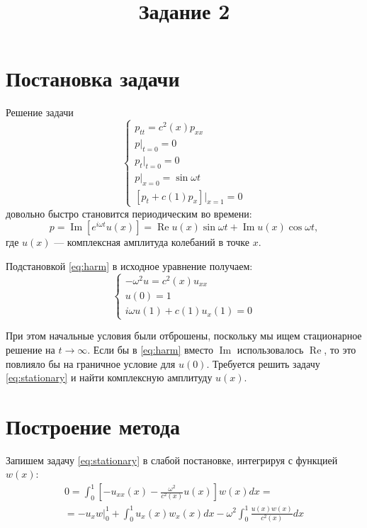 \documentclass[12pt]{article}
\title{Задание 2}
\date{}
\begin{document}
\maketitle

\section{Постановка задачи}

Решение задачи
\[
\begin{cases}
p_{tt} = c^2(x) p_{xx}\\
p\big|_{t = 0} = 0\\
p_t\big|_{t = 0} = 0\\
p\big|_{x = 0} = \sin \omega t\\
\left[p_t + c(1) p_x \right]\big|_{x = 1} = 0
\end{cases}
\]
довольно быстро становится периодическим во времени:
\begin{equation}
p = \operatorname{Im} \left[e^{i \omega t} u(x)\right] = 
\operatorname{Re} u(x) \sin \omega t +
\operatorname{Im} u(x) \cos \omega t,
\label{eq:harm}
\end{equation}
где $u(x)$ --- комплексная амплитуда колебаний в точке $x$.

Подстановкой \eqref{eq:harm} в исходное уравнение получаем:
\begin{equation}
\begin{cases}
-\omega^2 u = c^2(x) u_{xx}\\
u(0) = 1\\
i\omega u(1) + c(1) u_x(1) = 0
\end{cases}
\label{eq:stationary}
\end{equation}

При этом начальные условия были отброшены, поскольку мы ищем стационарное
решение на $t \rightarrow \infty$. Если бы в \eqref{eq:harm} вместо 
$\operatorname{Im}$ использовалось $\operatorname{Re}$, то это повлияло бы на
граничное условие для $u(0)$. Требуется решить задачу \eqref{eq:stationary}
и найти комплексную амплитуду $u(x)$.

\section{Построение метода}

Запишем задачу \eqref{eq:stationary} в слабой постановке, интегрируя с функцией $w(x)$:
\begin{multline}
0 = \int_0^1 \left[-u_{xx}(x) - \frac{\omega^2}{c^2(x)} u(x)\right] w(x) dx = \\
=-u_x w\Big|_0^1 + \int_0^1 u_x(x) w_x(x) dx - \omega^2 \int_0^1 \frac{u(x)
w(x)}{c^2(x)} dx
\end{multline}
\end{document}
